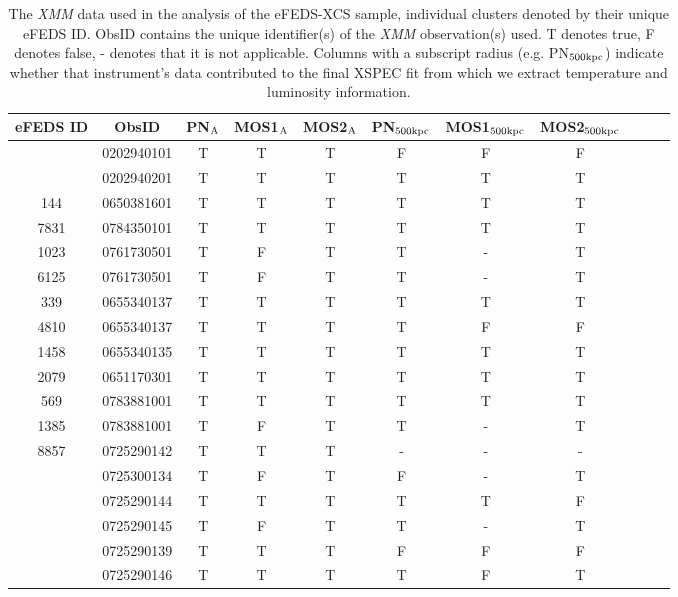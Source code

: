 \documentclass[fleqn,usenatbib]{mnras}
\begin{document}
\begin{table}
\begin{center}
\caption{{The {\em XMM} data used in the analysis of the eFEDS-XCS sample, individual clusters denoted by their unique eFEDS ID. ObsID contains the unique identifier(s) of the {\em XMM} observation(s) used. T denotes true, F denotes false, - denotes that it is not applicable. Columns with a subscript radius (e.g. PN$_{\rm{500kpc}}$) indicate whether that instrument's data contributed to the final XSPEC fit from which we extract temperature and luminosity information.}\label{tab:xmmobs}}
\vspace{1mm}
\begin{tabular}{ccccccccccc}
\hline
\hline
eFEDS ID & ObsID & PN$_{\rm{A}}$ & MOS1$_{\rm{A}}$ & MOS2$_{\rm{A}}$ & PN$_{\rm{500kpc}}$ & MOS1$_{\rm{500kpc}}$ & MOS2$_{\rm{500kpc}}$\\
\hline
\hline
\multirow{2}{4em}{\centering 6605} & 0202940101 & T & T & T & F & F & F \\ & 0202940201 & T & T & T & T & T & T \\ 
\hline
144 & 0650381601 & T & T & T & T & T & T \\ 
\hline
7831 & 0784350101 & T & T & T & T & T & T \\ 
\hline
1023 & 0761730501 & T & F & T & T & - & T \\ 
\hline
6125 & 0761730501 & T & F & T & T & - & T \\ 
\hline
339 & 0655340137 & T & T & T & T & T & T \\ 
\hline
4810 & 0655340137 & T & T & T & T & F & F \\ 
\hline
1458 & 0655340135 & T & T & T & T & T & T \\ 
\hline
2079 & 0651170301 & T & T & T & T & T & T \\ 
\hline
569 & 0783881001 & T & T & T & T & T & T \\ 
\hline
1385 & 0783881001 & T & F & T & T & - & T \\ 
\hline
8857 & 0725290142 & T & T & T & - & - & - \\ 
\hline
\multirow{3}{4em}{\centering 3171} & 0725300134 & T & F & T & F & - & T \\ & 0725290144 & T & T & T & T & T & F \\ & 0725290145 & T & F & T & T & - & T \\ 
\hline
\multirow{2}{4em}{\centering 8881} & 0725290139 & T & T & T & F & F & F \\ & 0725290146 & T & T & T & T & F & T \\ 

\end{tabular}
\end{center}
\end{table}
\end{document}
